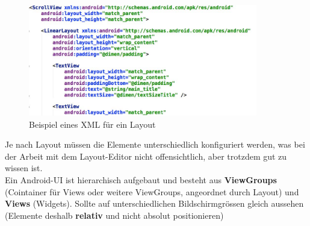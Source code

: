 \documentclass[a4paper]{article}
\begin{document}
\begin{figure}[htb!]
	\centering
	\includegraphics[width=10cm]{img/gui_xml_example.jpg}
	\caption{Beispiel eines XML für ein Layout}
	\label{fig:guixmlexamp}
\end{figure}
\noindent
Je nach Layout müssen die Elemente unterschiedlich konfiguriert werden, was bei der Arbeit mit dem Layout-Editor nicht offensichtlich, aber trotzdem gut zu wissen ist. \\
Ein Android-UI ist hierarchisch aufgebaut und besteht aus \textbf{ViewGroups} (Cointainer für Views oder weitere ViewGroups, angeordnet durch Layout) und \textbf{Views} (Widgets). Sollte auf unterschiedlichen Bildschirmgrössen gleich aussehen (Elemente deshalb \textbf{relativ} und nicht absolut positionieren)
\end{document}
